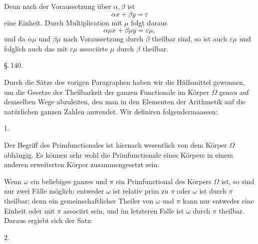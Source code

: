 
Denn nach der Voraussetzung über $\alpha, \beta$ ist
\[ \alpha x + \beta y = \varepsilon \]
eine Einheit. Durch Multiplication mit $\mu$ folgt daraus
\[ \alpha \mu x + \beta \mu y = \varepsilon \mu, \]
und da $\alpha \mu$ und $\beta \mu$ nach Voraussetzung durch $\beta$ theilbar sind, so ist auch $\varepsilon \mu$ und folglich auch das mit $\varepsilon \mu$ associirte $\mu$ durch $\beta$ theilbar.

\begin{center}
\S.\,140.

\end{center}

Durch die Sätze des vorigen Paragraphen haben wir die Hülfsmittel gewonnen, um die Gesetze der Theilbarkeit der ganzen Functionale im Körper $\Omega$ genau auf demselben Wege abzuleiten, den man in den Elementen der Arithmetik auf die natürlichen ganzen Zahlen anwendet. Wir definiren folgendermaassen:

1. 

Der Begriff des Primfunctionales ist hiernach wesentlich von dem Körper $\Omega$ abhängig. Es können sehr wohl die Primfunctionale eines Körpers in einem anderen erweiterten Körper zusammengesetzt sein.

Wenn $\omega$ ein beliebiges ganzes und $\pi$ ein Primfunctional des Körpers $\Omega$ ist, so sind nur zwei Fälle möglich: entweder $\omega$ ist relativ prim zu $\pi$ oder $\omega$ ist durch $\pi$ theilbar; denn ein gemeinschaftlicher Theiler von $\omega$ und $\pi$ kann nur entweder eine Einheit oder mit $\pi$ associirt sein, und im letzteren Falle ist $\omega$ durch $\pi$ theilbar. Daraus ergiebt sich der Satz:

2. 
